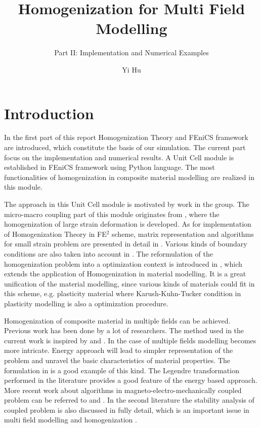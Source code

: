 \documentclass[10pt,a4paper]{scrreprt}
\author{Yi Hu}
\title{Homogenization for Multi Field Modelling}
\subtitle{Part II: Implementation and Numerical Examples}
\begin{document}
\chapter{Introduction}

In the first part of this report Homogenization Theory and FEniCS framework are introduced, which constitute the basis of our simulation. The current part focus on the implementation and numerical results. A Unit Cell module is established in FEniCS framework using Python language. The most functionalities of homogenization in composite material modelling are realized in this module.

The approach in this Unit Cell module is motivated by work in the group. The micro-macro coupling part of this module originates from \citep{miehe_computational_1999-1}, where the homogenization of large strain deformation is developed. As for implementation of Homogenization Theory in FE$^{2}$ scheme, matrix representation and algorithms for small strain problem are presented in detail in \citep{miehe_computational_2002}. Various kinds of boundary conditions are also taken into account in \citep{miehe_computational_2002}. The reformulation of the homogenization problem into a optimization context is introduced in \citep{miehe_strain-driven_2002}\citep{miehe_computational_2003} \citep{miehe_homogenization_2002}, which extends the application of Homogenization in material modelling. It is a great unification of the material modelling, since various kinds of materials could fit in this scheme, e.g. plasticity material where Karush-Kuhn-Tucker condition in plasticity modelling is also a optimization procedure.

Homogenization of composite material in multiple fields can be achieved. Previous work has been done by a lot of researchers. The method used in the current work is inspired by \citep{keip_two-scale_2014} and \citep{schroder_two-scale_2012}. In the case of multiple fields modelling becomes more intricate. Energy approach will lead to simpler representation of the problem and unravel the basic characteristics of material properties. The formulation in \citep{miehe_incremental_2011} is a good example of this kind. The Legendre transformation performed in the literature provides a good feature of the energy based approach. More recent work about algorithms in magneto-electro-mechanically coupled problem can be referred to \citep{schroeder_algorithmic_2016} and \citep{miehe_homogenization_2016}. In the second literature the stability analysis of coupled problem is also discussed in fully detail, which is an important issue in multi field modelling and homogenization \citep{geers_multi-scale_2010}.
\end{document}
